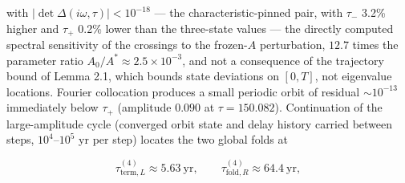 \documentclass[11pt]{article}
\begin{document}
with \(|\det\Delta(i\omega, \tau)| < 10^{-18}\) --- the
characteristic-pinned pair, with \(\tau_-\) 3.2\% higher and \(\tau_+\)
0.2\% lower than the three-state values --- the directly computed
spectral sensitivity of the crossings to the frozen-\(A\) perturbation,
\(12.7\) times the parameter ratio \(A_0/A^* \approx 2.5\times10^{-3}\),
and not a consequence of the trajectory bound of Lemma 2.1, which bounds
state deviations on \([0,T]\), not eigenvalue locations. Fourier
collocation produces a small periodic orbit of residual \(\sim10^{-13}\)
immediately below \(\tau_+\) (amplitude \(0.090\) at
\(\tau = 150.082\)). Continuation of the large-amplitude cycle
(converged orbit state and delay history carried between steps,
\(10^4\)--\(10^5\) yr per step) locates the two global folds at

\[\tau_{\mathrm{term},L}^{(4)} \approx 5.63\ \mathrm{yr},\qquad \tau_{\mathrm{fold},R}^{(4)} \approx 64.4\ \mathrm{yr},\]
\end{document}
